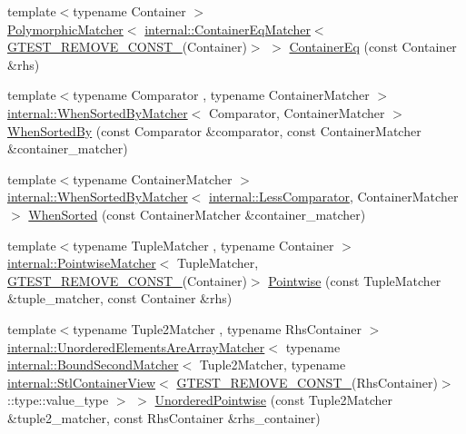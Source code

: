 \begin{DoxyCompactItemize}
\item 
{\footnotesize template$<$typename Container $>$ }\\\hyperlink{classtesting_1_1_polymorphic_matcher}{Polymorphic\+Matcher}$<$ \hyperlink{classtesting_1_1internal_1_1_container_eq_matcher}{internal\+::\+Container\+Eq\+Matcher}$<$ \hyperlink{gtest-internal_8h_a2ffec8c60510eb130af387f5ce9a756a}{G\+T\+E\+S\+T\+\_\+\+R\+E\+M\+O\+V\+E\+\_\+\+C\+O\+N\+S\+T\+\_\+}(Container)$>$ $>$ \hyperlink{namespacetesting_a5928ffc4e976a4da981512c422792840}{Container\+Eq} (const Container \&rhs)
\item 
{\footnotesize template$<$typename Comparator , typename Container\+Matcher $>$ }\\\hyperlink{classtesting_1_1internal_1_1_when_sorted_by_matcher}{internal\+::\+When\+Sorted\+By\+Matcher}$<$ Comparator, Container\+Matcher $>$ \hyperlink{namespacetesting_af74dfcde9ed88d79cf69dfda049078a3}{When\+Sorted\+By} (const Comparator \&comparator, const Container\+Matcher \&container\+\_\+matcher)
\item 
{\footnotesize template$<$typename Container\+Matcher $>$ }\\\hyperlink{classtesting_1_1internal_1_1_when_sorted_by_matcher}{internal\+::\+When\+Sorted\+By\+Matcher}$<$ \hyperlink{structtesting_1_1internal_1_1_less_comparator}{internal\+::\+Less\+Comparator}, Container\+Matcher $>$ \hyperlink{namespacetesting_a01468e3e641c72a2efb605b4c34675ee}{When\+Sorted} (const Container\+Matcher \&container\+\_\+matcher)
\item 
{\footnotesize template$<$typename Tuple\+Matcher , typename Container $>$ }\\\hyperlink{classtesting_1_1internal_1_1_pointwise_matcher}{internal\+::\+Pointwise\+Matcher}$<$ Tuple\+Matcher, \hyperlink{gtest-internal_8h_a2ffec8c60510eb130af387f5ce9a756a}{G\+T\+E\+S\+T\+\_\+\+R\+E\+M\+O\+V\+E\+\_\+\+C\+O\+N\+S\+T\+\_\+}(Container)$>$ \hyperlink{namespacetesting_a51ee81f6f1723f7a7aff0429b1d76ec1}{Pointwise} (const Tuple\+Matcher \&tuple\+\_\+matcher, const Container \&rhs)
\item 
{\footnotesize template$<$typename Tuple2\+Matcher , typename Rhs\+Container $>$ }\\\hyperlink{classtesting_1_1internal_1_1_unordered_elements_are_array_matcher}{internal\+::\+Unordered\+Elements\+Are\+Array\+Matcher}$<$ typename \hyperlink{classtesting_1_1internal_1_1_bound_second_matcher}{internal\+::\+Bound\+Second\+Matcher}$<$ Tuple2\+Matcher, typename \hyperlink{classtesting_1_1internal_1_1_stl_container_view}{internal\+::\+Stl\+Container\+View}$<$ \hyperlink{gtest-internal_8h_a2ffec8c60510eb130af387f5ce9a756a}{G\+T\+E\+S\+T\+\_\+\+R\+E\+M\+O\+V\+E\+\_\+\+C\+O\+N\+S\+T\+\_\+}(Rhs\+Container)$>$\+::type\+::value\+\_\+type $>$ $>$ \hyperlink{namespacetesting_a3e800c56ae70a6d9955077a75d4971f1}{Unordered\+Pointwise} (const Tuple2\+Matcher \&tuple2\+\_\+matcher, const Rhs\+Container \&rhs\+\_\+container)

\end{DoxyCompactItemize}
